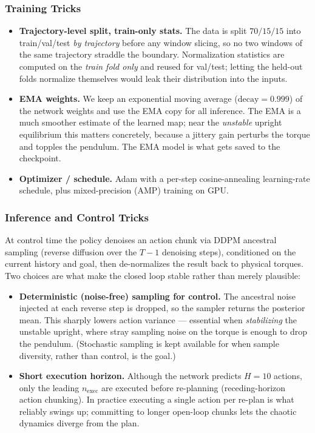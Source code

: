 \documentclass[11pt,a4paper]{article}
\begin{document}
\subsubsection{Training Tricks}
\begin{itemize}[leftmargin=1.5em]
  \item \textbf{Trajectory-level split, train-only stats.} The data is split
  $70/15/15$ into train/val/test \emph{by trajectory} before any window slicing, so
  no two windows of the same trajectory straddle the boundary. Normalization
  statistics are computed on the \emph{train fold only} and reused for val/test;
  letting the held-out folds normalize themselves would leak their distribution
  into the inputs.
  \item \textbf{EMA weights.} We keep an exponential moving average
  ($\text{decay} = 0.999$) of the network weights and use the EMA copy for all
  inference. The EMA is a much smoother estimate of the learned map; near the
  \emph{unstable} upright equilibrium this matters concretely, because a jittery
  gain perturbs the torque and topples the pendulum. The EMA model is what gets
  saved to the checkpoint.
  \item \textbf{Optimizer / schedule.} Adam with a per-step cosine-annealing
  learning-rate schedule, plus mixed-precision (AMP) training on GPU.
\end{itemize}

\subsubsection{Inference and Control Tricks}
At control time the policy denoises an action chunk via DDPM ancestral sampling
(reverse diffusion over the $T-1$ denoising steps), conditioned on the current history and goal,
then de-normalizes the result back to physical torques. Two choices are what make
the closed loop stable rather than merely plausible:
\begin{itemize}[leftmargin=1.5em]
  \item \textbf{Deterministic (noise-free) sampling for control.} The ancestral
  noise injected at each reverse step is dropped, so the sampler returns the
  posterior mean. This sharply lowers action variance --- essential when
  \emph{stabilizing} the unstable upright, where stray sampling noise on the torque
  is enough to drop the pendulum. (Stochastic sampling is kept available for when
  sample diversity, rather than control, is the goal.)
  \item \textbf{Short execution horizon.} Although the network predicts $H = 10$
  actions, only the leading $n_\text{exec}$ are executed before re-planning
  (receding-horizon action chunking). In practice executing a single action per
  re-plan is what reliably swings up; committing to longer open-loop chunks lets the
  chaotic dynamics diverge from the plan.
\end{itemize}
\end{document}
